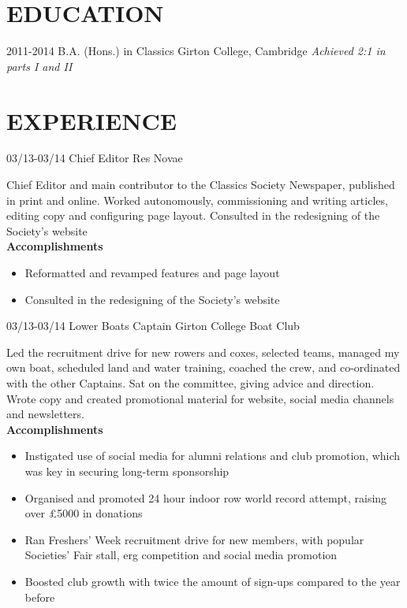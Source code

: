 \documentclass[]{friggeri-cv}
\begin{document}
\section{EDUCATION}

\begin{entrylist}
  \entry
    {2011-2014}
    {B.A. (Hons.) in Classics}
    {Girton College, Cambridge}
    {\emph{Achieved 2:1 in parts I and II}}
\end{entrylist}

\section{EXPERIENCE}

\begin{entrylist}
  \entry
    {03/13-03/14}
    {Chief Editor}
    {Res Novae}
    {Chief Editor and main contributor to the Classics Society Newspaper, published in print and online. Worked autonomously, commissioning and writing articles, editing copy and configuring page layout. Consulted in the redesigning of the Society’s website \\
    \textbf{Accomplishments}
    \begin{itemize}
    	\item Reformatted and revamped features and page layout
    	\item Consulted in the redesigning of the Society’s website
    \end{itemize}
    }
  \entry
  {03/13-03/14}
  {Lower Boats Captain}
  {Girton College Boat Club}
  {Led the recruitment drive for new rowers and coxes, selected teams, managed my own boat, scheduled land and water training, coached the crew, and co-ordinated with the other Captains. Sat on the committee, giving advice and direction. Wrote copy and created promotional material for website, social media channels and newsletters. \\
  	\textbf{Accomplishments}
  	\begin{itemize}
  		\item Instigated use of social media for alumni relations and club promotion, which was key in securing long-term sponsorship
  		\item Organised and promoted 24 hour indoor row world record attempt, raising over £5000 in donations
  		\item Ran Freshers' Week recruitment drive for new members, with popular Societies' Fair stall, erg competition and social media promotion
  		\item Boosted club growth with twice the amount of sign-ups compared to the year before
  	\end{itemize}
  }
\end{entrylist}
\end{document}
